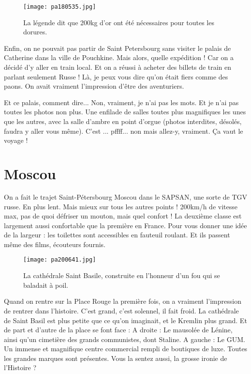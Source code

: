 \documentclass{book}
\begin{document}
\begin{wrapfigure}{l}{0.45\textwidth}
\centering
\texttt{[image: pa180535.jpg]}
\caption*{ La légende dit que 200kg d'or ont été nécessaires pour toutes les dorures.}
\end{wrapfigure}


Enfin, on ne pouvait pas partir de Saint Petersbourg sans visiter le palais de Catherine dans la ville de Pouchkine. Mais alors, quelle expédition ! Car on a décidé d'y aller en train local. Et on a réussi à acheter des billets de train en parlant seulement Russe ! Là, je peux vous dire qu'on était fiers comme des paons. On avait vraiment l'impression d'être des aventuriers.


Et ce palais, comment dire... Non, vraiment, je n'ai pas les mots. Et je n'ai pas toutes les photos non plus. Une enfilade de salles toutes plus magnifiques les unes que les autres, avec la salle d'ambre en point d'orgue (photos interdites, désolés, faudra y aller vous même).
C'est ... pffff... non mais allez-y, vraiment. Ça vaut le voyage !



\chapter{Moscou}
On a fait le trajet Saint-Pétersbourg Moscou dans le SAPSAN, une sorte de TGV russe. En plus lent. Mais mieux sur tous les autres points ! 200km/h de vitesse max, pas de quoi défriser un mouton, mais quel confort ! La deuxième classe est largement aussi confortable que la première en France. Pour vous donner une idée de la largeur : les toilettes sont accessibles en fauteuil roulant. Et ils passent même des films, écouteurs fournis.


\begin{wrapfigure}{l}{0.55\textwidth}
\centering
\texttt{[image: pa200641.jpg]}
\caption*{ La cathédrale Saint Basile, construite en l'honneur d'un fou qui se baladait à poil.}
\end{wrapfigure}

Quand on rentre sur la Place Rouge la première fois, on a vraiment l'impression de rentrer dans l'histoire. C'est grand, c'est solennel, il fait froid. La cathédrale de Saint Basil est plus petite que ce qu'on imaginait, et le Kremlin plus grand.
Et de part et d'autre de la place se font face :
A droite : Le mausolée de Lénine, ainsi qu'un cimetière des grands communistes, dont Staline.
A gauche : Le GUM. Un immense et magnifique centre commercial rempli de boutiques de luxe. Toutes les grandes marques sont présentes.
Vous la sentez aussi, la grosse ironie de l'Histoire ?
\end{document}
